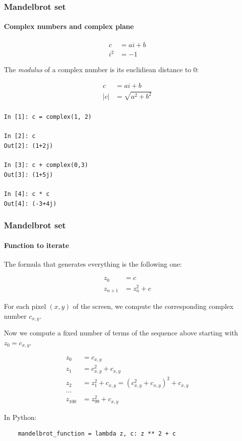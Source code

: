 \documentclass[9pt]{beamer}
\begin{document}
\begin{frame}[fragile]
  \frametitle{Mandelbrot set}

  \framesubtitle{Complex numbers and complex plane}

  \begin{align*}
    c &= ai + b\\
    i^{2} &= -1
  \end{align*}

  The \emph{modulus} of a complex number is its euclidiean distance to 0:

  \begin{align*}
    c &= ai + b \\
    |c| &= \sqrt{a^{2}+b^{2}} \\
  \end{align*}

  \begin{verbatim}
In [1]: c = complex(1, 2)

In [2]: c
Out[2]: (1+2j)

In [3]: c + complex(0,3)
Out[3]: (1+5j)

In [4]: c * c
Out[4]: (-3+4j)
  \end{verbatim}

\end{frame}

\begin{frame}[fragile]
  \frametitle{Mandelbrot set}

  \framesubtitle{Function to iterate}

  The formula that generates everything is the following one:

  \begin{align*}
    z_{0} &= c \\
    z_{n + 1} &= z_{n}^{2} + c
  \end{align*}

  For each pixel $(x, y)$ of the screen, we compute the corresponding
  complex number $c_{x,y}$.

  \bigskip

  Now we compute a fixed number of terms of the sequence above
  starting with $z_{0} = c_{x,y}$.

  \begin{align*}
    z_{0} &= c_{x, y} \\
    z_{1} &= c_{x, y}^{2} + c_{x, y} \\
    z_{2} &= z_{1}^{2} + c_{x, y} = (c_{x, y}^{2} + c_{x, y})^{2} + c_{x, y} \\
    \dots \\
    z_{100} &= z_{99}^{2} + c_{x, y}
  \end{align*}

  In Python:

  \begin{lstlisting}
    mandelbrot_function = lambda z, c: z ** 2 + c
  \end{lstlisting}

\end{frame}
\end{document}
